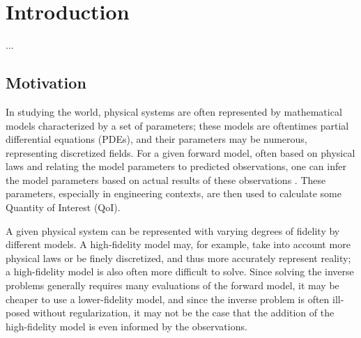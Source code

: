 \chapter{Introduction}
...
\section{Motivation}  %

In studying the world, physical systems are often represented by mathematical models characterized by a set of parameters; these models are oftentimes partial differential equations (PDEs), and their parameters may be numerous, representing discretized fields. For a given forward model, often based on physical laws and relating the model parameters to predicted observations, one can infer the model parameters based on actual results of these observations \cite{Taran05, BanksKuhn89}. These parameters, especially in engineering contexts, are then used to calculate some Quantity of Interest (QoI).

A given physical system can be represented with varying degrees of fidelity by different models. A high-fidelity model may, for example, take into account more physical laws or be finely discretized, and thus more accurately represent reality; a high-fidelity model is also often more difficult to solve. Since solving the inverse problems generally requires many evaluations of the forward model, it may be cheaper to use a lower-fidelity model, and since the inverse problem is often ill-posed without regularization, it may not be the case that the addition  of the high-fidelity model is even informed by the observations.



